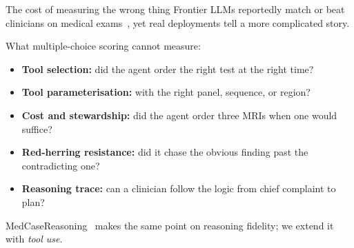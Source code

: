 \documentclass[aspectratio=169,t]{beamer}
\begin{document}
\begin{frame}{The cost of measuring the wrong thing}
  Frontier LLMs reportedly match or beat clinicians on medical
  exams~\cite{singhal2023medpalm2}, yet real deployments tell a
  more complicated story.

  \vspace{3mm}
  What multiple-choice scoring \alert{cannot} measure:
  \begin{itemize}\setlength\itemsep{0.4em}
    \item \textbf{Tool selection:} did the agent order the right test
          at the right time?
    \item \textbf{Tool parameterisation:} with the right panel,
          sequence, or region?
    \item \textbf{Cost and stewardship:} did the agent order three
          MRIs when one would suffice?
    \item \textbf{Red-herring resistance:} did it chase the obvious
          finding past the contradicting one?
    \item \textbf{Reasoning trace:} can a clinician follow the logic
          from chief complaint to plan?
  \end{itemize}

  \vspace{3mm}
  MedCaseReasoning~\cite{wu2025medcasereasoning} makes the same point
  on reasoning fidelity; we extend it with \emph{tool use}.
\end{frame}
\end{document}

